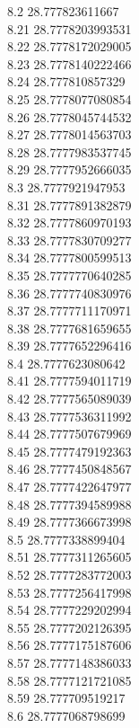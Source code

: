 {8.2	28.777823611667\\
8.21	28.7778203993531\\
8.22	28.7778172029005\\
8.23	28.7778140222466\\
8.24	28.777810857329\\
8.25	28.7778077080854\\
8.26	28.7778045744532\\
8.27	28.7778014563703\\
8.28	28.7777983537745\\
8.29	28.7777952666035\\
8.3	28.7777921947953\\
8.31	28.7777891382879\\
8.32	28.7777860970193\\
8.33	28.7777830709277\\
8.34	28.7777800599513\\
8.35	28.7777770640285\\
8.36	28.7777740830976\\
8.37	28.7777711170971\\
8.38	28.7777681659655\\
8.39	28.7777652296416\\
8.4	28.7777623080642\\
8.41	28.7777594011719\\
8.42	28.7777565089039\\
8.43	28.7777536311992\\
8.44	28.7777507679969\\
8.45	28.7777479192363\\
8.46	28.7777450848567\\
8.47	28.7777422647977\\
8.48	28.7777394589988\\
8.49	28.7777366673998\\
8.5	28.7777338899404\\
8.51	28.7777311265605\\
8.52	28.7777283772003\\
8.53	28.7777256417998\\
8.54	28.7777229202994\\
8.55	28.7777202126395\\
8.56	28.7777175187606\\
8.57	28.7777148386033\\
8.58	28.7777121721085\\
8.59	28.777709519217\\
8.6	28.7777068798699\\
}
